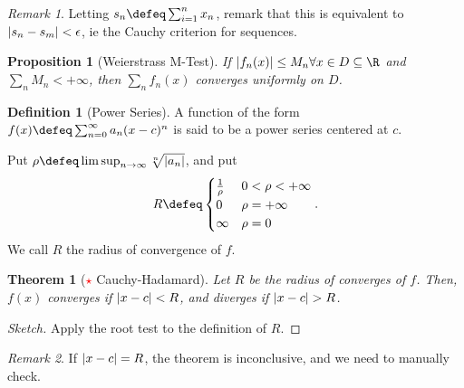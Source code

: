 \documentclass[12pt, oneside]{article}
\newcommand*{\important}{\textcolor{red}{$\star$} }
\theoremstyle{definition}
\newtheorem{defn}{Definition}
\theoremstyle{plain}
\newtheorem{thm}{Theorem}
\newtheorem{prop}{Proposition}
\theoremstyle{remark}
\newtheorem{remark}{Remark}
\begin{document}
\begin{remark}
  Letting $s_n \defeq \sum_{i=1}^n x_n$, remark that this is equivalent to $\abs{s_n - s_m} < \epsilon$, ie the Cauchy criterion for sequences.
\end{remark}

\begin{prop}[Weierstrass M-Test]
  If $\abs{f_n(x)} \leq M_n \forall x \in D \subseteq \R$ and $\sum_n M_n < + \infty$, then $\sum_n f_n(x)$ converges uniformly on $D$.
\end{prop}


\begin{defn}[Power Series]
  A function of the form $f(x) \defeq \sum_{n=0}^\infty a_n (x-c)^n$ is said to be a power series centered at $c$.

  Put $\rho \defeq \limsup_{n \to \infty} \sqrt[n]{\abs{a_n}}$, and put \[
  R \defeq \begin{cases}
    \frac{1}{\rho} & 0 < \rho < + \infty\\
    0 & \rho = +\infty\\
    \infty & \rho = 0
  \end{cases}.
  \]
  We call $R$ the radius of convergence of $f$.
\end{defn}

\begin{thm}[\important Cauchy-Hadamard]
  Let $R$ be the radius of converges of $f$. Then, $f(x)$ converges if $\abs{x - c} < R$, and diverges if $\abs{x -c} > R$.
\end{thm}
\begin{proof}[Sketch]
  Apply the root test to the definition of $R$.
\end{proof}

\begin{remark}
  If $\abs{x - c} = R$, the theorem is inconclusive, and we need to manually check.
\end{remark}
\end{document}
